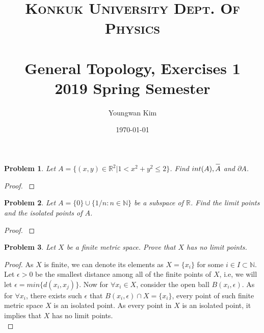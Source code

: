 \documentclass[paper=a4, fontsize=11pt]{scrartcl}
\title{	
	\normalfont \normalsize 
	\textsc{Konkuk University Dept. Of Physics} \\ [25pt] %
	\horrule{1pt} \\[0.4cm] 
	\huge General Topology, Exercises 1 \\
	\vspace{0.1in}
	\Large 2019 Spring Semester
	\horrule{1pt} \\[0.4cm] 
}
\author{Youngwan Kim}
\date{\normalsize\today}
\newcommand{\overbar}[1]{
	\mkern 1.5mu \overline{\mkern-1.5mu\raisebox{0pt}[\dimexpr\height+0.5mm\relax]{$#1$}\mkern-1.5mu}\mkern 1.5mu
}
\newtheorem{problem}{Problem}
\begin{document}
	
\maketitle	

\begin{problem}
	Let $A=\{ (x,y) \in \mathbb{R}^2 | 1 < x^2+y^2 \leq 2 \}$. Find $int(A) , \overbar{A}$ and $\partial A$.\\
\end{problem}

\begin{proof}
$ $ \newline


\end{proof}

\begin{problem}
	Let $A=\{0\}\cup\{1/n : n \in \mathbb{N}\}$ be a subspace of $\mathbb{R}$. Find the limit points and the isolated points of $A$.\\
\end{problem}

\begin{proof}
$ $ \newline
\vspace{-0.15in}
\end{proof}

\begin{problem}
	Let $X$ be a finite metric space. Prove that $X$ has no limit points.\\
\end{problem}

\begin{proof}
	As $X$ is finite, we can denote its elements as $X=\{x_i\}$ for some $i\in I \subset \mathbb{N}$. Let $\epsilon>0$ be the smallest distance among all of the finite points of $X$, i.e, we will let $\epsilon = min\{ d(x_i,x_j) \}$. Now for $\forall x_i \in X$, consider the open ball $B(x_i,\epsilon)$. As for $\forall x_i$, there exists such $\epsilon$ that $B(x_i, \epsilon) \cap X = \{x_i\}$, every point of such finite metric space $X$ is an isolated point. As every point in $X$ is an isolated point, it implies that $X$ has no limit points. \\
\end{proof}
\end{document}
